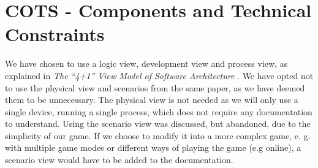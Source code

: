 \chapter{COTS - Components and Technical Constraints}
We have chosen to use a logic view, development view and process view, as explained in \textit{The “4+1” View Model of Software Architecture} \cite{krutchen}. We have opted not to use the physical view and scenarios from the same paper, as we have deemed them to be unnecessary. The physical view is not needed as we will only use a single device, running a single process, which does not require any documentation to understand. Using the scenario view was discussed, but abandoned, due to the simplicity of our game. If we choose to modify it into a more complex game, e. g. with multiple game modes or different ways of playing the game (e.g online), a scenario view would have to be added to the documentation. 